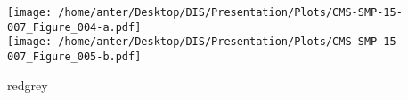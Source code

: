 \begin{frame}
\begin{minipage}[thbp]{0.6\textwidth}
\begin{itemize}
\end{itemize}
\end{minipage}
\hspace{5mm}
\begin{minipage}[thbp]{0.1\textwidth}
\vspace{-1.2mm}
\texttt{[image: /home/anter/Desktop/DIS/Presentation/Plots/CMS-SMP-15-007\_Figure\_004-a.pdf]}\\
\texttt{[image: /home/anter/Desktop/DIS/Presentation/Plots/CMS-SMP-15-007\_Figure\_005-b.pdf]}\\
\hspace*{10mm}\begin{beamercolorbox}[wd=23mm,ht=1mm,center,shadow=true, rounded=true]{redgrey}
{}
{\scalebox {0.61} {}}
\end{beamercolorbox}
\end{minipage}
\end{frame}

